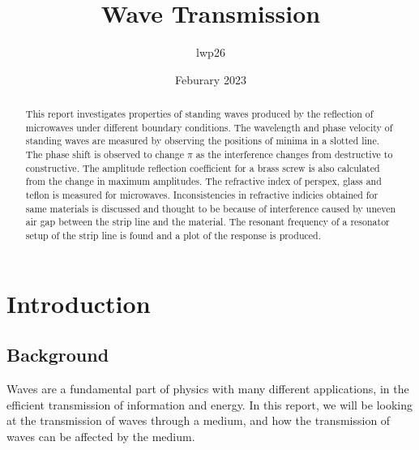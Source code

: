 \documentclass[12pt]{article}
\begin{document}
\title{Wave Transmission}
\author{lwp26}
\date{Feburary 2023}
\maketitle

\begin{abstract}
    \centering
    This report investigates properties of standing waves produced by the reflection of microwaves under different boundary conditions.
    The wavelength and phase velocity of standing waves are measured by observing the positions of minima in a slotted line.
    The phase shift is observed to change $\pi$ as the interference changes from destructive to constructive.
    The amplitude reflection coefficient for a brass screw is also calculated from the change in maximum amplitudes.
    The refractive index of perspex, glass and teflon is measured for microwaves. Inconsistencies in refractive indicies obtained for 
    same materials is discussed and thought to be because of interference caused by uneven air gap between the strip line and the material.
    The resonant frequency of a resonator setup of the strip line is found and a plot of the response is produced.

\end{abstract}


\section{Introduction}

\subsection{Background}

Waves are a fundamental part of physics with many different applications,
in the efficient transmission of information and energy. 
In this report, we will be looking at the transmission of waves through a medium, 
and how the transmission of waves can be affected by the medium.
\end{document}
